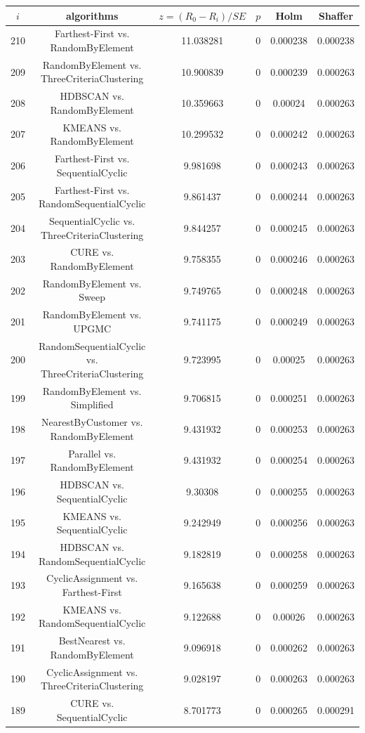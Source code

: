 \documentclass[a4paper,10pt]{article}
\begin{document}
\begin{landscape}
\begin{table}[!htp]
\centering\scriptsize
\begin{tabular}{cccccc}
$i$&algorithms&$z=(R_0 - R_i)/SE$&$p$&Holm&Shaffer\\
\hline210&Farthest-First vs. RandomByElement&11.038281&0&0.000238&0.000238\\
209&RandomByElement vs. ThreeCriteriaClustering&10.900839&0&0.000239&0.000263\\
208&HDBSCAN vs. RandomByElement&10.359663&0&0.00024&0.000263\\
207&KMEANS vs. RandomByElement&10.299532&0&0.000242&0.000263\\
206&Farthest-First vs. SequentialCyclic&9.981698&0&0.000243&0.000263\\
205&Farthest-First vs. RandomSequentialCyclic&9.861437&0&0.000244&0.000263\\
204&SequentialCyclic vs. ThreeCriteriaClustering&9.844257&0&0.000245&0.000263\\
203&CURE vs. RandomByElement&9.758355&0&0.000246&0.000263\\
202&RandomByElement vs. Sweep&9.749765&0&0.000248&0.000263\\
201&RandomByElement vs. UPGMC&9.741175&0&0.000249&0.000263\\
200&RandomSequentialCyclic vs. ThreeCriteriaClustering&9.723995&0&0.00025&0.000263\\
199&RandomByElement vs. Simplified&9.706815&0&0.000251&0.000263\\
198&NearestByCustomer vs. RandomByElement&9.431932&0&0.000253&0.000263\\
197&Parallel vs. RandomByElement&9.431932&0&0.000254&0.000263\\
196&HDBSCAN vs. SequentialCyclic&9.30308&0&0.000255&0.000263\\
195&KMEANS vs. SequentialCyclic&9.242949&0&0.000256&0.000263\\
194&HDBSCAN vs. RandomSequentialCyclic&9.182819&0&0.000258&0.000263\\
193&CyclicAssignment vs. Farthest-First&9.165638&0&0.000259&0.000263\\
192&KMEANS vs. RandomSequentialCyclic&9.122688&0&0.00026&0.000263\\
191&BestNearest vs. RandomByElement&9.096918&0&0.000262&0.000263\\
190&CyclicAssignment vs. ThreeCriteriaClustering&9.028197&0&0.000263&0.000263\\
189&CURE vs. SequentialCyclic&8.701773&0&0.000265&0.000291\\

\end{tabular}
\end{table}
\end{landscape}
\end{document}
